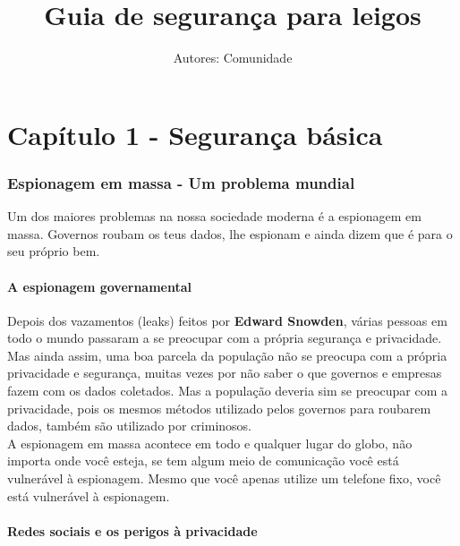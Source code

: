 \documentclass[12pt, letterpaper]{report}
\title{\Huge Guia de seguran\c{c}a para leigos} %
\author{Autores: Comunidade} %
\begin{document}
\maketitle %
\pagebreak %

\part{Capítulo 1 - Segurança básica}

\section*{Espionagem em massa - Um problema mundial} %

\large Um dos maiores problemas na nossa sociedade moderna é a espionagem em massa. Governos roubam os teus dados, lhe espionam e ainda dizem que é para o seu próprio bem.\\

\subsection{A espionagem governamental}

	Depois dos vazamentos (leaks) feitos por \textbf{Edward Snowden}, várias pessoas em todo o mundo passaram a se preocupar com a própria segurança e privacidade. Mas ainda assim, uma boa parcela da população não se preocupa com a própria privacidade e segurança, muitas vezes por não saber o que governos e empresas fazem com os dados coletados. Mas a população deveria sim se  preocupar com a privacidade, pois os mesmos métodos utilizado pelos governos para roubarem dados, também são utilizado por criminosos.\\

	A espionagem em massa acontece em todo e qualquer lugar do globo, não importa onde você esteja, se tem algum meio de comunicação você está vulnerável à espionagem. Mesmo que você apenas utilize um telefone fixo, você está vulnerável à espionagem.\\

\subsection{Redes sociais e os perigos à privacidade}
\end{document}

